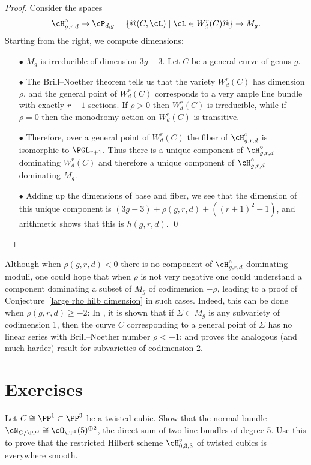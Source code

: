 \begin{proof}
Consider the spaces
$$
\cH^\circ_{g,r,d}
\to
\cP_{d,g} = \{@(C,\cL) \mid \cL \in W^r_d(C)@ \}
\to
M_g.
$$
Starting from the right, we compute dimensions:

\begin{enumerate}

\item[$\bullet$]  $M_g$ is irreducible of dimension $3g-3$. Let $C$
be a general curve of genus $g$.

\item[$\bullet$]
The Brill--Noether theorem tells us that the variety $W^r_d(C)$ has
dimension $\rho$, and the general point of $W^r_d(C)$ corresponds to a
very ample line bundle with exactly $r+1$ sections.
If $\rho>0$ then $W^r_d(C)$ is irreducible, while if $\rho = 0$ then
the monodromy action on $W^r_d(C)$
is transitive.

\item[$\bullet$] Therefore, over a general point of $W^r_d(C)$ the fiber
of $\cH^\circ_{g,r,d} $ is
isomorphic to $\PGL_{r+1}$. Thus there is a unique component of
$\cH^\circ_{g,r,d}$ dominating
$W^r_d(C)$ and therefore a unique component of $\cH^\circ_{g,r,d}$
dominating $M_g$.

\item[$\bullet$] Adding up the dimensions of base and fiber, we see that
the dimension
of this unique component is $(3g-3)+\rho(g,r,d) +((r+1)^2-1)$,
and arithmetic shows that this is $h(g,r,d)$.
\qed
\end{enumerate}
\let\qed\relax
\end{proof}

\begin{fact}\label{Hilb with rho geq -2}
 Although when $\rho(g,r,d)<0$ there is no component of
 $\cH^{\circ}_{g,r,d}$ dominating moduli, one could hope
that when $\rho$ is not very negative one could understand a component
dominating a subset of $M_{g}$ of codimension $-\rho$, leading to a
proof of Conjecture~\ref{large rho hilb dimension} in such cases.
Indeed, this can be done when $\rho(g,r,d)\geq -2$:
In \cite{BrillNoether-1}, it is shown that if $\Sigma \subset M_g$
is any subvariety of codimension 1, then the curve $C$ corresponding
to a general point of $\Sigma$ has no linear series with Brill--Noether
number $\rho < -1$; and
 \cite{Edidin} proves the analogous
(and much harder) result for subvarieties of codimension 2.
\end{fact}


\section{Exercises}
\begin{exercise}\label{twisted cubic normal bundle}
Let $C \cong \PP^1 \subset \PP^3$ be a twisted cubic. Show that the normal
bundle $\cN_{C/\PP^3} \cong \cO_{\PP^1}(5)^{\oplus 2}$, the direct sum
of two line bundles of degree 5. Use this to prove that the restricted
Hilbert scheme $\cH^\circ_{0,3,3}$ of twisted cubics is everywhere
%
smooth.
\end{exercise}

